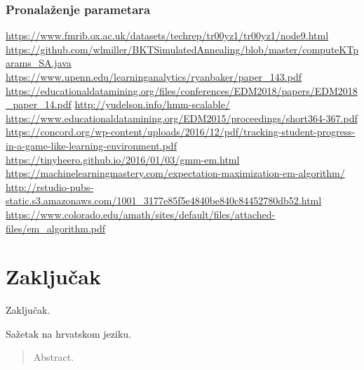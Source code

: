 \documentclass[times, utf8,projekt]{fer}
\begin{document}
\subsection{Pronalaženje parametara}
\url{https://www.fmrib.ox.ac.uk/datasets/techrep/tr00yz1/tr00yz1/node9.html}\newline
\url{https://github.com/wlmiller/BKTSimulatedAnnealing/blob/master/computeKTparams_SA.java}\newline
\url{https://www.upenn.edu/learninganalytics/ryanbaker/paper_143.pdf}\newline
\url{https://educationaldatamining.org/files/conferences/EDM2018/papers/EDM2018_paper_14.pdf}\newline
\url{http://yudelson.info/hmm-scalable/}\newline
\url{https://www.educationaldatamining.org/EDM2015/proceedings/short364-367.pdf}\newline
\url{https://concord.org/wp-content/uploads/2016/12/pdf/tracking-student-progress-in-a-game-like-learning-environment.pdf}\newline
\url{https://tinyheero.github.io/2016/01/03/gmm-em.html}\newline
\url{https://machinelearningmastery.com/expectation-maximization-em-algorithm/}\newline
\url{http://rstudio-pubs-static.s3.amazonaws.com/1001_3177e85f5e4840be840c84452780db52.html}\newline
\url{https://www.colorado.edu/amath/sites/default/files/attached-files/em_algorithm.pdf}

\chapter{Zaključak}
Zaključak.




\begin{sazetak}
Sažetak na hrvatskom jeziku.

\end{sazetak}

\begin{abstract}
Abstract.

\end{abstract}
\end{document}
